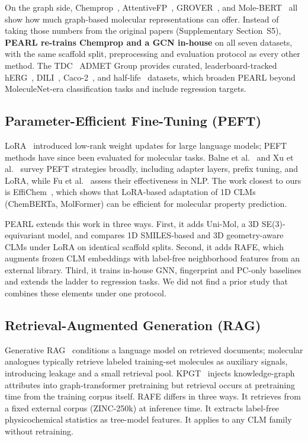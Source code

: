 \documentclass[pdflatex,sn-mathphys-num,Numbered]{sn-jnl}%
\begin{document}
On the graph side, Chemprop~\cite{yang2019chemprop}, AttentiveFP~\cite{xiong2020attentivefp}, GROVER~\cite{rong2020grover}, and Mole-BERT~\cite{xia2023molecbert} all show how much graph-based molecular representations can offer. Instead of taking those numbers from the original papers (Supplementary Section~S5), \textbf{PEARL re-trains Chemprop and a GCN in-house} on all seven datasets, with the same scaffold split, preprocessing and evaluation protocol as every other method. The TDC~\cite{huang2021tdc} ADMET Group provides curated, leaderboard-tracked hERG~\cite{wang2016herg}, DILI~\cite{xu2019dili}, Caco-2~\cite{wang2016caco2}, and half-life~\cite{obach2008half} datasets, which broaden PEARL beyond MoleculeNet-era classification tasks and include regression targets.

\subsection{Parameter-Efficient Fine-Tuning (PEFT)}\label{sec:related_peft}
LoRA~\cite{hu2021lora} introduced low-rank weight updates for large language models; PEFT methods have since been evaluated for molecular tasks. Balne et al.~\cite{balne2024peft} and Xu et al.~\cite{xu2023peftreview} survey PEFT strategies broadly, including adapter layers, prefix tuning, and LoRA, while Fu et al.~\cite{fu2023effectiveness} assess their effectiveness in NLP. The work closest to ours is EffiChem~\cite{harod2025effichem}, which shows that LoRA-based adaptation of 1D CLMs (ChemBERTa, MolFormer) can be efficient for molecular property prediction.

PEARL extends this work in three ways. First, it adds Uni-Mol, a 3D SE(3)-equivariant model, and compares 1D SMILES-based and 3D geometry-aware CLMs under LoRA on identical scaffold splits. Second, it adds RAFE, which augments frozen CLM embeddings with label-free neighborhood features from an external library. Third, it trains in-house GNN, fingerprint and PC-only baselines and extends the ladder to regression tasks. We did not find a prior study that combines these elements under one protocol.

\subsection{Retrieval-Augmented Generation (RAG)}\label{sec:related_rag}
Generative RAG~\cite{lewis2020rag} conditions a language model on retrieved documents; molecular analogues typically retrieve labeled training-set molecules as auxiliary signals, introducing leakage and a small retrieval pool. KPGT~\cite{liu2022kpgt} injects knowledge-graph attributes into graph-transformer pretraining but retrieval occurs at pretraining time from the training corpus itself. RAFE differs in three ways. It retrieves from a fixed external corpus (ZINC-250k) at inference time. It extracts label-free physicochemical statistics as tree-model features. It applies to any CLM family without retraining.
\end{document}

